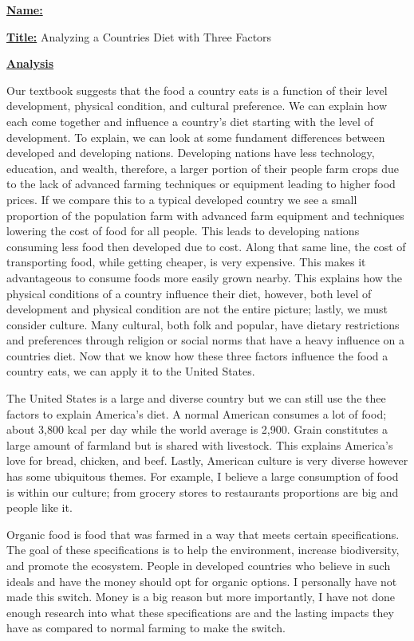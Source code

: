 \documentclass{article}
\author{Ryan Bruno}
\date{\today}
\renewcommand{\maketitle}{
\textbf{\underline{Name:}}
\theauthor

\textbf{\underline{Title:}}
Analyzing a Countries Diet with Three Factors
}
\begin{document}
\maketitle

\textbf{\underline{Analysis}}

\setlength{\parindent}{10ex}
Our textbook suggests that the food a country eats is a function of their level development, physical condition, and cultural preference. We can explain how each come together and influence a country's diet starting with the level of development. To explain, we can look at some fundament differences between developed and developing nations. Developing nations have less technology, education, and wealth, therefore, a larger portion of their people farm crops due to the lack of advanced farming techniques or equipment leading to higher food prices. If we compare this to a typical developed country we see a small proportion of the population farm with advanced farm equipment and techniques lowering the cost of food for all people. This leads to developing nations consuming less food then developed due to cost. Along that same line, the cost of transporting food, while getting cheaper, is very expensive. This makes it advantageous to consume foods more easily grown nearby. This explains how the physical conditions of a country influence their diet, however, both level of development and physical condition are not the entire picture; lastly, we must consider culture. Many cultural, both folk and popular, have dietary restrictions and preferences through religion or social norms that have a heavy influence on a countries diet. Now that we know how these three factors influence the food a country eats, we can apply it to the United States. 

The United States is a large and diverse country but we can still use the thee factors to explain America's diet. A normal American consumes a lot of food; about 3,800 kcal per day while the world average is 2,900. Grain constitutes a large amount of farmland but is shared with livestock. This explains America's love for bread, chicken, and beef. Lastly, American culture is very diverse however has some ubiquitous themes. For example, I believe a large consumption of food is within our culture; from grocery stores to restaurants proportions are big and people like it.

Organic food is food that was farmed in a way that meets certain specifications. The goal of these specifications is to help the environment, increase biodiversity, and promote the ecosystem. People in developed countries who believe in such ideals and have the money should opt for organic options. I personally have not made this switch. Money is a big reason but more importantly, I have not done enough research into what these specifications are and the lasting impacts they have as compared to normal farming to make the switch.
\end{document}
